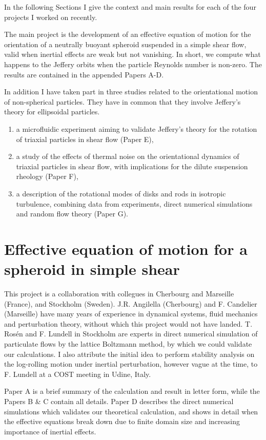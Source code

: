 \documentclass[thesis.tex]{subfiles}
\begin{document}
In the following Sections I give the context and main results for each of the four projects I worked on recently. 

The main project is the development of an effective equation of motion for the orientation of a neutrally buoyant spheroid suspended in a simple shear flow, valid when inertial effects are weak but not vanishing. In short, we compute what happens to the Jeffery orbits when the particle Reynolds number is non-zero. The results are contained in the appended Papers A-D.

In addition I have taken part in three studies related to the orientational motion of non-spherical particles. They have in common that they involve Jeffery's theory for ellipsoidal particles.
\begin{enumerate}
    \item a microfluidic experiment aiming to validate Jeffery's theory for the rotation of triaxial particles in shear flow (Paper E),
    \item a study of the effects of thermal noise on the orientational dynamics of triaxial particles in shear flow, with implications for the dilute suspension rheology (Paper F),
    \item a description of the rotational modes of disks and rods in isotropic turbulence, combining data from experiments, direct numerical simulations and random flow theory (Paper G).
\end{enumerate}


\chapter[Effective equation for a spheroid]{Effective equation of motion for a spheroid in simple shear}\label{sec:effective}

This project is a collaboration with collegues in Cherbourg and Marseille (France), and Stockholm (Sweden). J.R. Angilella (Cherbourg) and F. Candelier (Marseille) have many years of experience in dynamical systems, fluid mechanics and perturbation theory, without which this project would not have landed. T. Ros\'en and F. Lundell in Stockholm are experts in direct numerical simulation of particulate flows by the lattice Boltzmann method, by which we could validate our calculations. I also attribute the initial idea to perform stability analysis on the log-rolling motion under inertial perturbation, however vague at the time, to F. Lundell at a COST meeting in Udine, Italy. 

Paper A is a brief summary of the calculation and result in letter form, while the Papers B \& C contain all details. Paper D describes the direct numerical simulations which validates our theoretical calculation, and shows in detail when the effective equations break down due to finite domain size and increasing importance of inertial effects.
\end{document}
